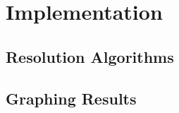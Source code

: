 \chapter{Implementation}\label{chap:implementation}
\section{Resolution Algorithms}
\section{Graphing Results}